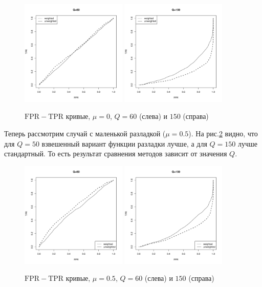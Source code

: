 \documentclass{math-mech-sci}
\begin{document}
\begin{figure}[h]
	\includegraphics[width=0.45\textwidth]{def_10}
	\includegraphics[width=0.45\textwidth]{def_100}\caption{$\mathrm{FPR}-\mathrm{TPR}$ кривые, $\mu=0$, $Q=60$ (слева) и $150$ (справа)}\label{fig:def}
\end{figure}

Теперь рассмотрим случай с маленькой разладкой ($\mu=0.5$). На рис.\ref{fig:ex} видно, что для $Q=50$ взвешенный вариант функции разладки лучше, а для $Q=150$ лучше стандартный. То есть результат сравнения методов зависит от значения $Q$.


\begin{figure}[h]
	\includegraphics[width=0.45\textwidth]{ex_10}
	\includegraphics[width=0.45\textwidth]{ex_100}\caption{$\mathrm{FPR}-\mathrm{TPR}$ кривые, $\mu=0.5$, $Q=60$ (слева) и $150$ (справа)}\label{fig:ex}
\end{figure}
\end{document}

